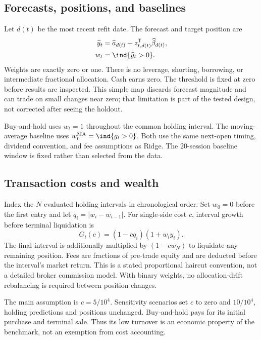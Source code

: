 \subsection{Forecasts, positions, and baselines}
Let $d(t)$ be the most recent refit date. The forecast and target position are
\begin{align}
 \widehat y_t &= \widehat a_{d(t)}
 +z_{t,d(t)}^{\mathsf T}\widehat\beta_{d(t)},\\
 w_t &= \ind\{\widehat y_t>0\}.
 \label{eq:position}
\end{align}
Weights are exactly zero or one. There is no leverage, shorting, borrowing, or intermediate fractional allocation. Cash earns zero. The threshold is fixed at zero before results are inspected. This simple map discards forecast magnitude and can trade on small changes near zero; that limitation is part of the tested design, not corrected after seeing the holdout.

Buy-and-hold uses $w_t=1$ throughout the common holding interval. The moving-average baseline uses $w_t^{\mathrm{MA}}=\ind\{g_t>0\}$. Both use the same next-open timing, dividend convention, and fee assumptions as Ridge. The 20-session baseline window is fixed rather than selected from the data.

\subsection{Transaction costs and wealth}
Index the $N$ evaluated holding intervals in chronological order. Set $w_0=0$ before the first entry and let $q_i=|w_i-w_{i-1}|$. For single-side cost $c$, interval growth before terminal liquidation is
\begin{equation}
 G_i(c)=(1-cq_i)(1+w_i y_i).
 \label{eq:fees}
\end{equation}
The final interval is additionally multiplied by $(1-cw_N)$ to liquidate any remaining position. Fees are fractions of pre-trade equity and are deducted before the interval's market return. This is a stated proportional haircut convention, not a detailed broker commission model. With binary weights, no allocation-drift rebalancing is required between position changes.

The main assumption is $c=5/10^4$. Sensitivity scenarios set $c$ to zero and $10/10^4$, holding predictions and positions unchanged. Buy-and-hold pays for its initial purchase and terminal sale. Thus its low turnover is an economic property of the benchmark, not an exemption from cost accounting.


